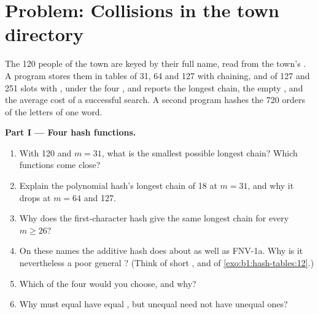 \section{Problem: Collisions in the town directory}\label{sec:b1:hash-tables:problem}

\begin{problem}\label{pb:b1:hash-tables:1}
The 120 people of the town are keyed by their full name, read from the town's . A program stores them
in tables of 31, 64 and 127  with chaining, and of 127 and 251 slots with , under the four , and reports the longest chain, the empty , and the average cost of a successful search. A second
program hashes the 720 orders of the letters of one word.
\label{out:b1:hash-tables:town}
\label{out:b1:hash-tables:anagrams}

\medskip\noindent\textbf{Part I --- Four hash functions.}
\begin{enumerate}
\item With 120  and $m = 31$, what is the smallest possible longest chain? Which functions come close?
\item Explain the polynomial hash's longest chain of 18 at $m = 31$, and why it drops at $m = 64$ and 127.
\item Why does the first-character hash give the same longest chain for every $m \geq 26$?
\item On these names the additive hash does about as well as FNV-1a. Why is it nevertheless a poor general ? (Think of short , and of \cref{exo:b1:hash-tables:12}.)
\item Which of the four would you choose, and why?
\item Why must equal  have equal , but unequal  need not have unequal ones?
\end{enumerate}


\end{problem}
